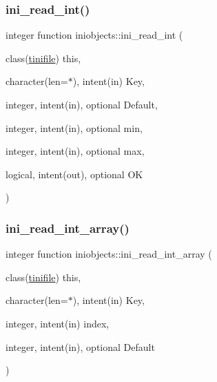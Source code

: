 \subsubsection{\texorpdfstring{ini\+\_\+read\+\_\+int()}{ini\_read\_int()}}
{\footnotesize\ttfamily integer function iniobjects\+::ini\+\_\+read\+\_\+int (\begin{DoxyParamCaption}\item[{class(\mbox{\hyperlink{structiniobjects_1_1tinifile}{tinifile}})}]{this,  }\item[{character(len=$\ast$), intent(in)}]{Key,  }\item[{integer, intent(in), optional}]{Default,  }\item[{integer, intent(in), optional}]{min,  }\item[{integer, intent(in), optional}]{max,  }\item[{logical, intent(out), optional}]{OK }\end{DoxyParamCaption})\hspace{0.3cm}{\ttfamily [private]}}

\mbox{\label{namespaceiniobjects_a83bc292e9738adde7e94413ff8fb38d7}} 
\subsubsection{\texorpdfstring{ini\+\_\+read\+\_\+int\+\_\+array()}{ini\_read\_int\_array()}}
{\footnotesize\ttfamily integer function iniobjects\+::ini\+\_\+read\+\_\+int\+\_\+array (\begin{DoxyParamCaption}\item[{class(\mbox{\hyperlink{structiniobjects_1_1tinifile}{tinifile}})}]{this,  }\item[{character(len=$\ast$), intent(in)}]{Key,  }\item[{integer, intent(in)}]{index,  }\item[{integer, intent(in), optional}]{Default }\end{DoxyParamCaption})\hspace{0.3cm}{\ttfamily [private]}}

\mbox{\label{namespaceiniobjects_a67f08b5a06f2f74225f692955a712320}} 
